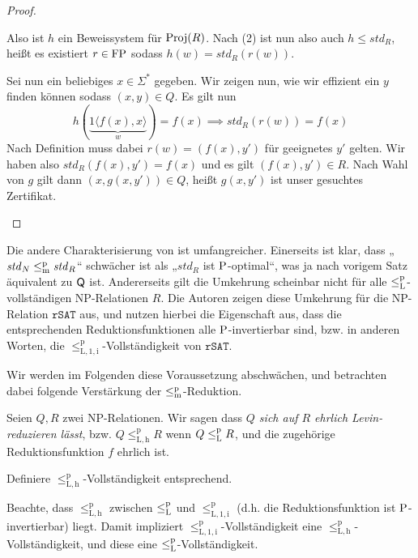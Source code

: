 \begin{proof}
\begin{prooflist}
    Also ist $h$ ein Beweissystem für $\Proj(R)$. Nach (2) ist nun also auch $h\leq \mathit{std}_R$, heißt es existiert $r\in\FP$ sodass $h(w)=\mathit{std}_R(r(w))$.

    Sei nun ein beliebiges $x\in\Sigma^*$ gegeben. Wir zeigen nun, wie wir effizient ein $y$ finden können sodass $(x,y)\in Q$. Es gilt nun
    \[ h(\underbrace{1\langle f(x), x\rangle}_w)=f(x) \implies \mathit{std}_R(r(w))=f(x) \]
    Nach Definition muss dabei $r(w)=(f(x), y')$ für geeignetes $y'$ gelten.
    Wir haben also $\mathit{std}_R(f(x), y')=f(x)$ und es gilt $(f(x), y')\in R$. Nach Wahl von $g$ gilt dann $(x, g(x, y'))\in Q$, heißt $g(x, y')$ ist unser gesuchtes Zertifikat. 
    \end{prooflist}
\end{proof}


Die andere Charakterisierung von \citeauthor{fenner_inverting_2003} ist umfangreicher.
Einerseits ist klar, dass „$\mathit{std}_N\leqmp\mathit{std}_R$“ schwächer ist als „$\mathit{std}_R$ ist $\P$-optimal“, was ja nach vorigem Satz äquivalent zu $\hQ$ ist.
Andererseits gilt die Umkehrung scheinbar nicht für alle $\leqlp$-vollständigen NP-Relationen $R$. 
Die Autoren zeigen diese Umkehrung für die NP-Relation $\mathtt{rSAT}$ aus, und nutzen hierbei die Eigenschaft aus, dass die entsprechenden Reduktionsfunktionen alle $\P$-invertierbar sind, bzw. in anderen Worten, die $\leq_\mathrm{L,1,i}^\mathrm p$-Vollständigkeit von $\mathtt{rSAT}$.

Wir werden im Folgenden diese Voraussetzung abschwächen, und betrachten dabei folgende Verstärkung der $\leqmp$-Reduktion.
\begin{definition}
    Seien $Q, R$ zwei NP-Relationen. Wir sagen dass \emph{$Q$ sich auf $R$ ehrlich Levin-reduzieren lässt}, bzw. $Q\leq_\mathrm{L,h}^\mathrm p R$ wenn $Q\leqlp R$, und die zugehörige Reduktionsfunktion $f$ ehrlich ist.

    Definiere $\leq_\mathrm{L,h}^\mathrm p$-Vollständigkeit entsprechend.
\end{definition}
Beachte, dass $\leq_\mathrm{L,h}^\mathrm p$ zwischen $\leqlp$ und $\leq_\mathrm{L,1,i}^\mathrm{p}$ (d.h. die Reduktionsfunktion ist $\P$-invertierbar) liegt.
Damit impliziert $\leq_\mathrm{L,1,i}^\mathrm{p}$-Vollständigkeit eine  $\leq_\mathrm{L,h}^\mathrm p$-Vollständigkeit, und diese eine $\leqlp$-Vollständigkeit.

